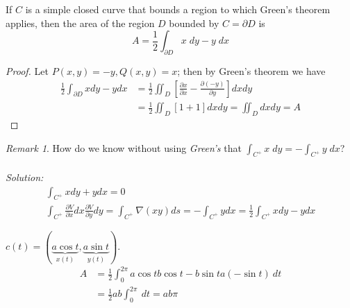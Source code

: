 \documentclass[12pt]{book}
\theoremstyle{definition}
\theoremstyle{remark}
\newtheorem*{remark}{Remark}
\newcommand\sol{%
  \\ 
  \\
  \textit{Solution:}\\%
}
\begin{document}
  \begin{proposition} 
    If $C$ is a simple closed curve that bounds a region to which Green’s theorem applies, then the area of the region $D$ bounded by $C = \partial D$ is
    $$A = \frac{1}{2} \int _{\partial D} x \; dy - y \; dx $$
    \begin{proof} 
      Let $P(x, y)=-y, Q(x, y)=x$; then by Green's theorem we have
\begin{equation*}
\begin{aligned}
\frac{1}{2} \int_{\partial D} x d y-y d x & =\frac{1}{2} \iint_D\left[\frac{\partial x}{\partial x}-\frac{\partial(-y)}{\partial y}\right] d x d y \\
& =\frac{1}{2} \iint_D[1+1] d x d y=\iint_D d x d y=A
\end{aligned}
\end{equation*}
    \end{proof}
  \end{proposition}
  \begin{remark} 
    How do we know without using \textit{Green's} that $\int_{C^+} x \; dy = -\int_{C^+} y \; dx$?
    \sol 
    \begin{equation*}
      \begin{split}
        \int_{C^+} x dy + y dx = 0 \\ 
        \int_{C^+} \frac{\partial {V}}{\partial {x}}dx \frac{\partial {V}}{\partial {y}} dy = \int_{C^+} \nabla (xy) ds = - \int_{C^+} y dx = \frac{1}{2} \int_{C^+} x dy -y dx 
      \end{split}
    \end{equation*}
  \end{remark}
  \begin{example}$c(t) = (\underbrace{a \cos t}_{x(t)} ,\underbrace{a \sin t}_{y(t)})$. 
  \begin{equation*}
    \begin{split}
      A &=\frac{1}{2} \int_{{0}}^{{2\pi}} a \cos t b \cos t -b\sin t a (-\sin t ) \: d{t} \\ 
      &= \frac{1}{2} ab \int_{{0}}^{{2\pi}}  \: d{t} = ab \pi
    \end{split}
  \end{equation*}
    
  \end{example}
\end{document}
